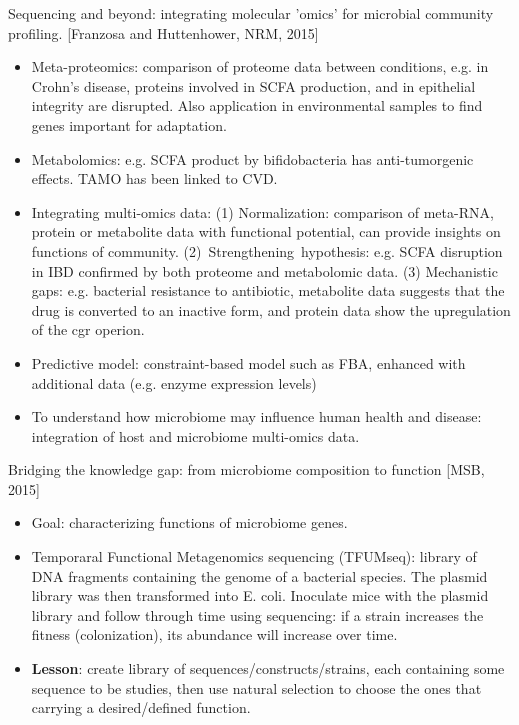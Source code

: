 \documentclass{report}
\begin{document}
Sequencing and beyond: integrating molecular 'omics' for microbial community profiling. [Franzosa and Huttenhower, NRM, 2015]
\begin{itemize}
	\item Meta-proteomics: comparison of proteome data between conditions, e.g. in Crohn’s disease, proteins involved in SCFA production, and in epithelial integrity are disrupted. Also application in environmental samples to find genes important for adaptation.
	
	\item Metabolomics: e.g. SCFA product by bifidobacteria has anti-tumorgenic effects. TAMO has been linked to CVD.
	
	\item Integrating multi-omics data: (1) Normalization: comparison of meta-RNA, protein or metabolite data with functional potential, can provide insights on functions of community. (2) Strengthening hypothesis: e.g. SCFA disruption in IBD confirmed by both proteome and metabolomic data. (3) Mechanistic gaps: e.g. bacterial resistance to antibiotic, metabolite data suggests that the drug is converted to an inactive form, and protein data show the upregulation of the cgr operion.
	
	\item Predictive model: constraint-based model such as FBA, enhanced with additional data (e.g. enzyme expression levels)
	
	\item To understand how microbiome may influence human health and disease: integration of host and microbiome multi-omics data.
\end{itemize}

Bridging the knowledge gap: from microbiome composition to function [MSB, 2015]
\begin{itemize}
\item Goal: characterizing functions of microbiome genes. 

\item Temporaral Functional Metagenomics sequencing (TFUMseq): library of DNA fragments containing the genome of a bacterial species. The plasmid library was then transformed into E. coli. Inoculate mice with the plasmid library and follow through time using sequencing: if a strain increases the fitness (colonization), its abundance will increase over time. 

\item \textbf{Lesson}: create library of sequences/constructs/strains, each containing some sequence to be studies, then use natural selection to choose the ones that carrying a desired/defined function. 
\end{itemize}
\end{document}

